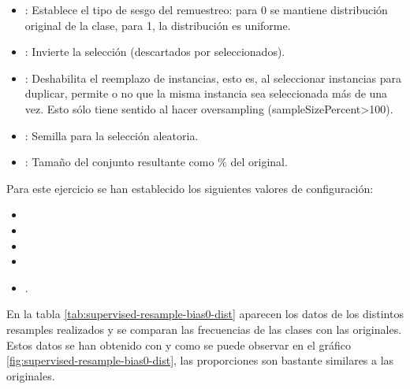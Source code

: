 \begin{itemize}
    \item {}: Establece el tipo de sesgo del remuestreo: para 0 se mantiene distribución original de la clase, para 1, la distribución es uniforme.
    \item {}: Invierte la selección (descartados por seleccionados).
    \item {}: Deshabilita el reemplazo de instancias, esto es, al seleccionar instancias para duplicar, permite o no que la misma instancia sea seleccionada más de una vez. Esto sólo tiene sentido al hacer oversampling (sampleSizePercent>100).
    \item {}: Semilla para la selección aleatoria.
    \item {}: Tamaño del conjunto resultante como \% del original.
\end{itemize}

Para este ejercicio se han establecido los siguientes valores de configuración:
\begin {itemize}
    \item {}
    \item {}
    \item {}
    \item {}
    \item {}.
\end{itemize}

En la tabla \ref{tab:supervised-resample-bias0-dist} aparecen los datos de los distintos resamples realizados y se comparan las frecuencias de las clases con las originales. Estos datos se han obtenido con  y como se puede observar en el gráfico \ref{fig:supervised-resample-bias0-dist}, las proporciones son bastante similares a las originales.

